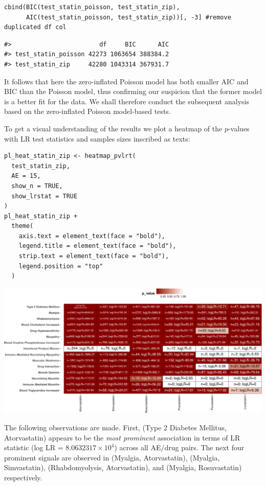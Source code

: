 \begin{verbatim}
cbind(BIC(test_statin_poisson, test_statin_zip),
      AIC(test_statin_poisson, test_statin_zip))[, -3] #remove duplicated df col
\end{verbatim}

\begin{verbatim}
#>                        df     BIC      AIC
#> test_statin_poisson 42273 1063654 388384.2
#> test_statin_zip     42280 1043314 367931.7
\end{verbatim}

\noindent It follows that here the zero-inflated Poisson model has both smaller AIC and BIC than the Poisson model, thus confirming our suspicion that the former model is a better fit for the data. We shall therefore conduct the subsequent analysis based on the zero-inflated Poisson model-based tests.

To get a visual understanding of the results we plot a heatmap of the \(p\)-values with LR test statistics and samples sizes inscribed as texts:

\begin{verbatim}
pl_heat_statin_zip <- heatmap_pvlrt(
  test_statin_zip,
  AE = 15,
  show_n = TRUE,
  show_lrstat = TRUE
) 
pl_heat_statin_zip +
  theme(
    axis.text = element_text(face = "bold"),
    legend.title = element_text(face = "bold"),
    strip.text = element_text(face = "bold"),
    legend.position = "top"
  )
\end{verbatim}

\begin{center}\includegraphics[width=1\linewidth]{RJ-2023-027_files/figure-latex/heatmap-zip-statin-latex-1} \end{center}

The following observations are made. First, (Type 2 Diabetes Mellitus, Atorvastatin) appears to be the \emph{most prominent} association in terms of LR statistic (log LR = \ensuremath{8.0632317\times 10^{4}}) across all AE/drug pairs. The next four prominent signals are observed in (Myalgia, Atorvastatin), (Myalgia, Simvastatin), (Rhabdomyolysis, Atorvastatin), and (Myalgia, Rosuvastatin) respectively.

